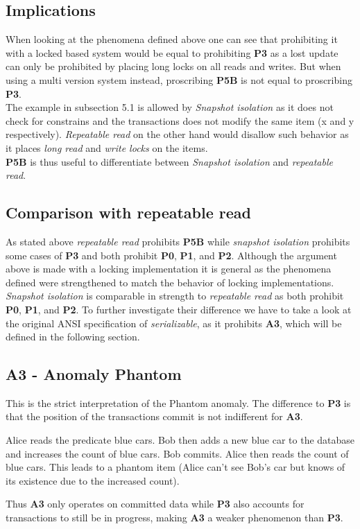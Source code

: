\documentclass[sigconf, review=false]{acmart}
\begin{document}
\subsection{Implications}
When looking at the phenomena defined above one can see that prohibiting it with a locked based system
would be equal to prohibiting \textbf{P3} as a lost update can only be prohibited by placing long locks on all reads and writes.
But when using a multi version system instead, proscribing \textbf{ \textbf{P5B}} is not equal to proscribing \textbf{P3}.\\
The example in subsection 5.1 is allowed by \emph{Snapshot isolation} as it does not check for constrains and the transactions
does not modify the same item (x and y respectively). \emph{Repeatable read} on the other hand would disallow such
behavior as it places \emph{long read} and \emph{write locks} on the items.\\
\textbf{P5B} is thus useful to differentiate between \emph{Snapshot isolation} and \emph{repeatable read}.
\subsection{Comparison with repeatable read}
As stated above \emph{repeatable read} prohibits \textbf{P5B} while \emph{snapshot isolation} prohibits some cases of
\textbf{P3} and both prohibit \textbf{P0}, \textbf{P1}, and \textbf{P2}. Although the argument above is made with a locking implementation
it is general as the phenomena defined were strengthened to match the behavior of locking implementations. \\
\emph{Snapshot isolation} is comparable in strength to \emph{repeatable read} as both prohibit \textbf{P0}, \textbf{P1}, and \textbf{P2}.
To further investigate their difference we have to take a look at the original ANSI specification of \emph{serializable},
as it prohibits	\textbf{A3}, which will be defined in the following section.
\subsection{A3 - Anomaly Phantom}
This is the strict interpretation of the Phantom anomaly. The difference to \textbf{P3} is that the position of the
transactions commit is not indifferent for \textbf{A3}.
\begin{example}
    Alice reads the predicate blue cars. Bob then adds a new blue car to the database and increases
    the count of blue cars. Bob commits.  Alice then reads the count of blue cars. This leads to a phantom item
    (Alice can’t see Bob's car but knows of its existence due to the increased count).
\end{example}
Thus \textbf{A3} only operates on committed data while \textbf{P3} also accounts for transactions to still be in progress,
making \textbf{A3} a weaker phenomenon than \textbf{P3}.
\end{document}
